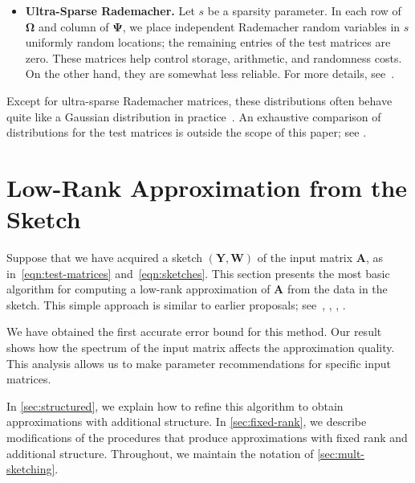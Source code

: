 \documentclass[final]{siamart1116}
\numberwithin{equation}{section}
\numberwithin{theorem}{section}
\numberwithin{figure}{section}
\newcommand{\mtx}[1]{\bm{#1}}
\begin{document}
\begin{itemize}
\item	\textbf{Ultra-Sparse Rademacher.}  Let $s$ be a sparsity parameter.
In each row of $\mtx{\Omega}$ and column of $\mtx{\Psi}$,
we place independent Rademacher random variables in $s$ uniformly random locations;
the remaining entries of the test matrices are zero.
These matrices help control storage, arithmetic,
and randomness costs.  On the other hand, they are somewhat less reliable. For more details, see~\cite{CW13:Low-Rank-Approximation,NN13:OSNAP-Faster,
MM13:Low-Distortion-Subspace,NN14:Lower-Bounds,Woo14:Sketching-Tool,BDN15:Toward-Unified,Coh16:Nearly-Tight}.
\end{itemize}

\vspace{0.5pc}

\noindent
Except for ultra-sparse Rademacher matrices, these distributions often behave
quite like a Gaussian distribution in practice~\cite[Sec.~7.4]{HMT11:Finding-Structure}.
An exhaustive comparison of distributions for the test matrices
is outside the scope of this paper; see \cite{Lib09:Accelerated-Dense}.

\section{Low-Rank Approximation from the Sketch} \label{sec:low-rank-recon}

Suppose that we have acquired a sketch $(\mtx{Y}, \mtx{W})$
of the input matrix $\mtx{A}$, as in~\cref{eqn:test-matrices} and~\cref{eqn:sketches}.
This section presents the most basic algorithm for computing a low-rank approximation
of $\mtx{A}$ from the data in the sketch.  This simple approach
is similar to earlier proposals;
see~\cite[Sec.~5.2]{WLRT08:Fast-Randomized},
\cite[Thm.~4.7]{CW09:Numerical-Linear},
\cite[Sec.~5.5]{HMT11:Finding-Structure},
\cite[Thm.~4.3, display 1]{Woo14:Sketching-Tool}.

We have obtained the first accurate error bound for this method.
Our result shows how the spectrum of the input matrix affects
the approximation quality.  This analysis allows us to
make parameter recommendations for specific input matrices.

In \cref{sec:structured}, we explain how to refine this algorithm to obtain approximations
with additional structure.
In \cref{sec:fixed-rank}, we describe modifications
of the procedures that produce approximations
with fixed rank and additional structure.
Throughout, we maintain the notation of \cref{sec:mult-sketching}.
\end{document}
